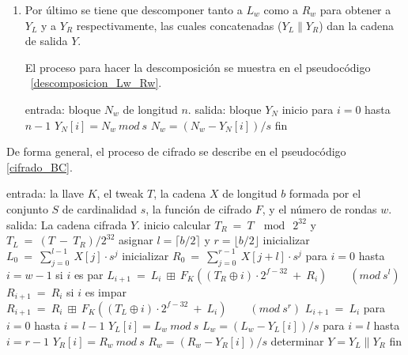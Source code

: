 \begin{enumerate}
  \item Por último se tiene que descomponer tanto a $L_w$ como a $R_w$ para
    obtener a $Y_L$ y a $Y_R$ respectivamente, las cuales concatenadas
    ($Y_L \parallel Y_R$) dan la cadena de salida $Y$.

    El proceso para hacer la descomposición se muestra en el pseudocódigo
   ~\ref{descomposicion_Lw_Rw}.

\begin{pseudocodigo}[caption={Proceso de descomposición de $L_w$ o $R_w$.},
    label={descomposicion_Lw_Rw}]
   entrada:   bloque $N_w$ de longitud $n$.
   salida:    bloque $Y_N$
   inicio
     para $i=0$ hasta $n-1$
       $Y_N[i] = N_w\ mod\ s$
       $N_w = (N_w - Y_N[i])/s$
   fin
\end{pseudocodigo}

\end{enumerate}

De forma general, el proceso de cifrado se describe en el pseudocódigo
\ref{cifrado_BC}.

\begin{pseudocodigo}[caption={Proceso de cifrado $BC$.},
label={cifrado_BC}]
    entrada:    la llave $K$,
                el tweak $T$,
                la cadena $X$ de longitud $b$ formada por el conjunto $S$
                  de cardinalidad $s$,
                la función de cifrado $F$, y el número de rondas $w$.
    salida:     La cadena cifrada $Y$.
    inicio
      calcular $T_R\: =\: T\: \mod\: 2^{32}$ y $T_L\: =\: (T\: -\: T_R) / 2^{32}$
      asignar $l = \lceil b/2 \rceil$ y $r = \lfloor b/2 \rfloor$
      inicializar $L_0\: =\: \sum_{j=0}^{l-1}\: X[j] \cdot s^j$
      inicializar $R_0\: =\: \sum_{j=0}^{r-1}\: X[j+l] \cdot s^j$
      para $i=0$ hasta $i=w-1$
        si $i$ es par
          $L_{i+1}\: =\: L_i\: \boxplus\: F_K((T_R \oplus i) \cdot 2^{f-32}\: +\: R_i)\qquad (mod\ s^l)$
          $R_{i+1}\: =\: R_i$
        si $i$ es impar
          $R_{i+1}\: =\: R_i\: \boxplus\: F_K((T_L \oplus i) \cdot 2^{f-32}\: +\: L_i)\qquad (mod\ s^r)$
          $L_{i+1}\: =\: L_i$
      para $i=0$ hasta $i=l-1$
        $Y_L[i] = L_w\ mod\ s$
        $L_w = (L_w - Y_L[i])/s$
      para $i=l$ hasta $i=r-1$
        $Y_R[i] = R_w\ mod\ s$
        $R_w = (R_w - Y_R[i])/s$
      determinar $Y = Y_L \parallel Y_R$
    fin
\end{pseudocodigo}

